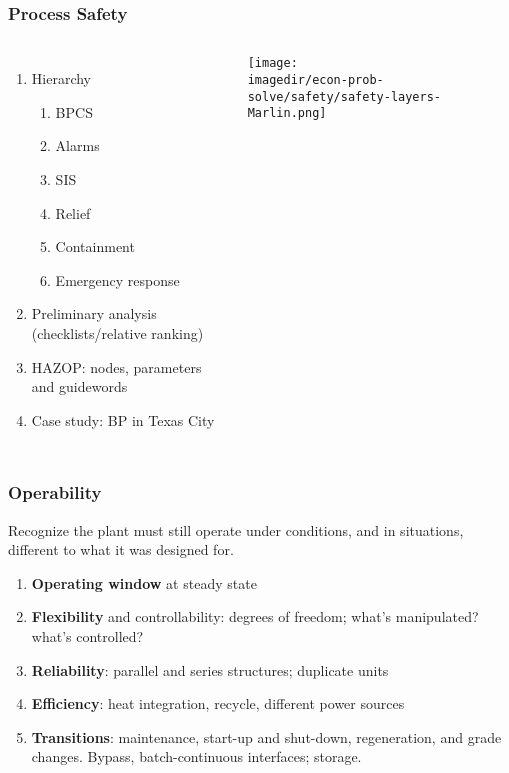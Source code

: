 \begin{frame}\frametitle{Process Safety}
	\begin{columns}[t]
			\begin{enumerate}
				\item	Hierarchy
				\begin{enumerate}
					\item	BPCS
					\item	Alarms
					\item	SIS
					\item	Relief
					\item	Containment
					\item	Emergency response
				\end{enumerate}
				\item	Preliminary analysis (checklists/relative ranking)
				\item	HAZOP: nodes, parameters and guidewords
				\item	Case study: BP in Texas City
			\end{enumerate}
			\vspace{-20pt}
			\begin{center}
				\texttt{[image: \\imagedir/econ-prob-solve/safety/safety-layers-Marlin.png]}
			\end{center}
	\end{columns}	
\end{frame}

\begin{frame}\frametitle{Operability}
	\begin{exampleblock}{}
		Recognize the plant must still operate under conditions, and in situations, different to what it was designed for.
	\end{exampleblock}
	\begin{enumerate}
		\item	\textbf{Operating window} at steady state
		\item	\textbf{Flexibility} and controllability: degrees of freedom; what's manipulated? what's controlled?
		\item	\textbf{Reliability}: parallel and series structures; duplicate units
		\item	\textbf{Efficiency}: heat integration, recycle, different power sources
		\item	\textbf{Transitions}: maintenance, start-up and shut-down, regeneration, and grade changes. Bypass, batch-continuous interfaces; storage.
	\end{enumerate}
\end{frame}

